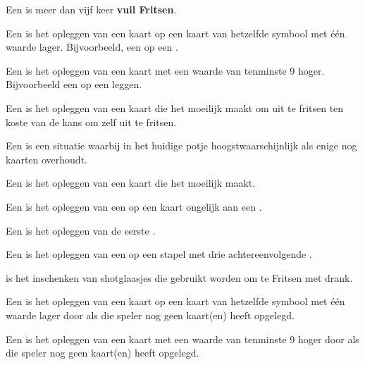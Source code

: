 
\item Een  is meer dan vijf keer \textbf{vuil Fritsen}\footnotemark[2].

\item Een  is het opleggen van een kaart op een kaart van hetzelfde symbool met \'e\'en waarde lager. Bijvoorbeeld, een  op een .

\item Een  is het opleggen van een kaart met een waarde van tenminste 9 hoger. Bijvoorbeeld een  op een  leggen.

\item Een  is het opleggen van een kaart die het \andereSpelers moeilijk maakt om uit te fritsen ten koste van de kans om zelf uit te fritsen.

\item Een  is een situatie waarbij \eenSpeler in het huidige potje hoogstwaarschijnlijk als enige nog kaarten overhoudt.

\item Een  is het opleggen van een kaart die het \andereSpelers moeilijk maakt.

\item Een  is het opleggen van een  op een kaart ongelijk aan een .

\item Een  is het opleggen van de eerste .

\item Een  is het opleggen van een  op een stapel met drie achtereenvolgende .

\item {} is het inschenken van shotglaasjes die gebruikt worden om te Fritsen met drank.

\item Een  is het opleggen van een kaart op een kaart van hetzelfde symbool met \'e\'en waarde lager door \Willem als die speler nog geen kaart(en) heeft opgelegd.

\item Een  is het opleggen van een kaart met een waarde van tenminste 9 hoger door \Willem als die speler nog geen kaart(en) heeft opgelegd.


